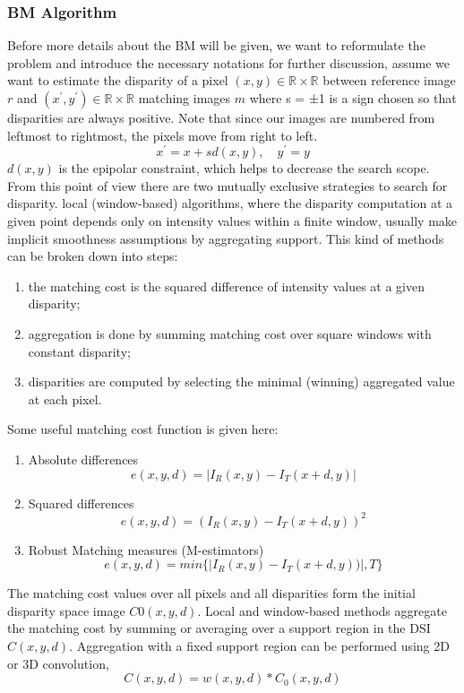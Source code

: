 \subsubsection{BM Algorithm}
\label{BM Algorithm}
Before more details about the BM will be given, we want to reformulate the problem and introduce the necessary notations for further discussion, assume we want to estimate the disparity of a pixel $(x,y) \in \mathbb{R}\times \mathbb{R}$ between reference image $r$ and  $(x^{'},y^{'}) \in \mathbb{R}\times \mathbb{R}$ matching images $m$ where s = ±1 is a sign chosen so that disparities are always positive. Note that since our images are numbered from leftmost to rightmost, the pixels move from right to left\cite{scharstein2002taxonomy}.
\begin{equation}
    x^{'} = x + sd(x,y), \quad y^{'} = y
\end{equation}
$d(x,y)$ is the epipolar constraint, which helps to decrease the search scope. From this point of view there are two mutually exclusive strategies to search for disparity. local (window-based) algorithms, where the disparity computation at a given point depends only on intensity values within a finite window, usually make implicit smoothness assumptions by aggregating support. This kind of methods can be broken down into steps:
\begin{enumerate}
    \item the matching cost is the squared difference of intensity values at a given disparity;
    \item aggregation is done by summing matching cost over square windows with constant disparity;
    \item disparities are computed by selecting the minimal (winning) aggregated value at each pixel.
\end{enumerate}
Some useful matching cost function is given here:
\begin{enumerate}
    \item Absolute differences
        \begin{equation}
            e(x,y,d) = |I_R(x,y)-I_T(x+d,y)|
        \end{equation}
    \item Squared differences
        \begin{equation}
            e(x,y,d) = (I_R(x,y)-I_T(x+d,y))^2
        \end{equation}
    \item Robust Matching measures (M-estimators)
    \begin{equation}
        e(x,y,d) = min \{|I_R(x,y)-I_T(x+d,y))|, T \}
    \end{equation}
\end{enumerate}
The matching cost values over all pixels and all disparities form the initial disparity space image $C0(x, y, d)$. Local and window-based methods aggregate the matching cost by summing or averaging over a support region in the DSI 
$C(x, y, d)$. Aggregation with a fixed support region can be performed
using 2D or 3D convolution, 
\begin{equation}
    C(x, y, d) = w(x, y, d) \ast C_0(x, y, d)
\end{equation}



